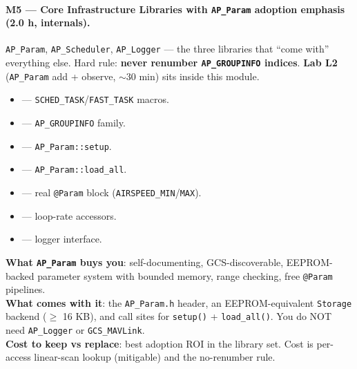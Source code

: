 \documentclass[a4paper,11pt,twoside]{article}
\renewcommand{\adoptionsidebar}[1]{\begin{tcolorbox}[colback=cyan!4!white,colframe=cyan!50!black,title=Adoption side-bar,breakable]#1\end{tcolorbox}}
\begin{document}
\paragraph{M5 --- Core Infrastructure Libraries with \texttt{AP\_Param} adoption emphasis (2.0 h, internals).}
\texttt{AP\_Param}, \texttt{AP\_Scheduler}, \texttt{AP\_Logger} --- the three libraries that ``come with'' everything else. Hard rule: \textbf{never renumber \texttt{AP\_GROUPINFO} indices}. \textbf{Lab L2} (\texttt{AP\_Param} add + observe, $\sim$30 min) sits inside this module.
\begin{itemize}
  \item {} --- \texttt{SCHED\_TASK}/\texttt{FAST\_TASK} macros.
  \item {} --- \texttt{AP\_GROUPINFO} family.
  \item {} --- \texttt{AP\_Param::setup}.
  \item {} --- \texttt{AP\_Param::load\_all}.
  \item {} --- real \texttt{@Param} block (\texttt{AIRSPEED\_MIN}/\texttt{MAX}).
  \item {} --- loop-rate accessors.
  \item {} --- logger interface.
\end{itemize}

\adoptionsidebar{
\textbf{What \texttt{AP\_Param} buys you}: self-documenting, GCS-discoverable, EEPROM-backed parameter system with bounded memory, range checking, free \texttt{@Param} pipelines.\\
\textbf{What comes with it}: the \texttt{AP\_Param.h} header, an EEPROM-equivalent \texttt{Storage} backend ($\geq$ 16 KB), and call sites for \texttt{setup()} + \texttt{load\_all()}. You do NOT need \texttt{AP\_Logger} or \texttt{GCS\_MAVLink}.\\
\textbf{Cost to keep vs replace}: best adoption ROI in the library set. Cost is per-access linear-scan lookup (mitigable) and the no-renumber rule.}
\end{document}
